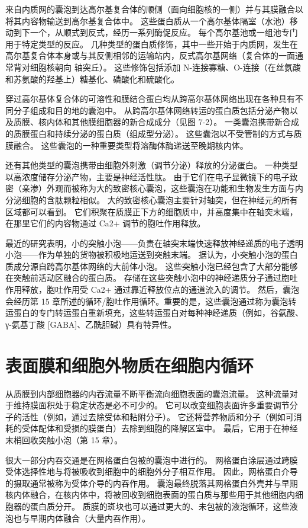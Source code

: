 来自内质网的囊泡到达高尔基复合体的顺侧（面向细胞核的一侧）并与其膜融合以将其内容物输送到高尔基复合体中。 这些蛋白质从一个高尔基体隔室（水池）移动到下一个，从顺式到反式，经历一系列酶促反应。 每个高尔基池或一组池专门用于特定类型的反应。 几种类型的蛋白质修饰，其中一些开始于内质网，发生在高尔基复合体本身或与其反侧相邻的运输站内，反式高尔基网络（复合体的一面通常背对细胞核朝向 轴突丘）。 这些修饰包括添加 N-连接寡糖、O-连接（在丝氨酸和苏氨酸的羟基上）糖基化、磷酸化和硫酸化。

穿过高尔基体复合体的可溶性和膜结合蛋白均从跨高尔基体网络出现在各种具有不同分子组成和目的地的囊泡中。 从跨高尔基体网络转运的蛋白质包括分泌产物以及质膜、核内体和其他膜细胞器的新合成成分（见图 7-2）。 一类囊泡携带新合成的质膜蛋白和持续分泌的蛋白质（组成型分泌）。 这些囊泡以不受管制的方式与质膜融合。 这些囊泡的一种重要类型将溶酶体酶递送至晚期核内体。

还有其他类型的囊泡携带由细胞外刺激（调节分泌）释放的分泌蛋白。 一种类型以高浓度储存分泌产物，主要是神经活性肽。 由于它们在电子显微镜下的电子致密（亲渗）外观而被称为大的致密核心囊泡，这些囊泡在功能和生物发生方面与内分泌细胞的含肽颗粒相似。 大的致密核心囊泡主要针对轴突，但在神经元的所有区域都可以看到。 它们积聚在质膜正下方的细胞质中，并高度集中在轴突末端，在那里它们的内容物通过 Ca2+ 调节的胞吐作用释放。

最近的研究表明，小的突触小泡——负责在轴突末端快速释放神经递质的电子透明小泡——作为单独的货物被积极地运送到突触末端。 据认为，小突触小泡的蛋白质成分源自跨高尔基体网络的大前体小泡。 这些突触小泡已经包含了大部分能够在突触前活动区融合的蛋白质。 存储在这些突触小泡中的神经递质分子通过胞吐作用释放，胞吐作用受 Ca2+ 通过靠近释放位点的通道流入的调节。 然后，囊泡会经历第 15 章所述的循环/胞吐作用循环。重要的是，这些囊泡通过称为囊泡转运蛋白的专门转运蛋白重新填充，这些转运蛋白对每种神经递质（例如，谷氨酸、γ-氨基丁酸 [GABA]、乙酰胆碱）具有特异性。


\section{表面膜和细胞外物质在细胞内循环}
从质膜到内部细胞器的内吞流量不断平衡流向细胞表面的囊泡流量。 这种流量对于维持膜面积处于稳定状态是必不可少的。 它可以改变细胞表面许多重要调节分子的活性（例如，通过去除受体和粘附分子）。 它还将营养物质和分子（例如可消耗的受体配体和受损的膜蛋白）去除到细胞的降解区室中。 最后，它用于在神经末梢回收突触小泡（第 15 章）。

很大一部分内吞交通是在网格蛋白包被的囊泡中进行的。 网格蛋白涂层通过跨膜受体选择性地与将被吸收到细胞中的细胞外分子相互作用。 因此，网格蛋白介导的摄取通常被称为受体介导的内吞作用。 囊泡最终脱落其网格蛋白外壳并与早期核内体融合，在核内体中，将被回收到细胞表面的蛋白质与那些用于其他细胞内细胞器的蛋白质分开。 质膜的斑块也可以通过更大的、未包被的液泡循环，这些液泡也与早期内体融合（大量内吞作用）。




